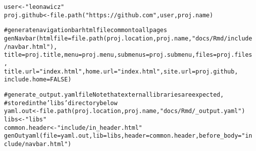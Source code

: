 \documentclass{article}\usepackage[]{graphicx}\usepackage[]{color}
\makeatletter
\newcommand{\hlnum}[1]{\textcolor[rgb]{0.863,0.196,0.184}{#1}}%
\newcommand{\hlstr}[1]{\textcolor[rgb]{0.863,0.196,0.184}{#1}}%
\newcommand{\hlcom}[1]{\textcolor[rgb]{0.345,0.431,0.459}{#1}}%
\newcommand{\hlstd}[1]{\textcolor[rgb]{0.514,0.58,0.588}{#1}}%
\newcommand{\hlkwb}[1]{\textcolor[rgb]{0.522,0.6,0}{#1}}%
\newcommand{\hlkwc}[1]{\textcolor[rgb]{0.796,0.294,0.086}{#1}}%
\newcommand{\hlkwd}[1]{\textcolor[rgb]{0.576,0.631,0.631}{#1}}%
\newenvironment{kframe}{%
 \def\at@end@of@kframe{}%
 \ifinner\ifhmode%
  \def\at@end@of@kframe{\end{minipage}}%
  \begin{minipage}{\columnwidth}%
 \fi\fi%
 \def\FrameCommand##1{\hskip\@totalleftmargin \hskip-\fboxsep
 \colorbox{shadecolor}{##1}\hskip-\fboxsep
     \hskip-\linewidth \hskip-\@totalleftmargin \hskip\columnwidth}%
 \MakeFramed {\advance\hsize-\width
   \@totalleftmargin\z@ \linewidth\hsize
   \@setminipage}}%
 {\par\unskip\endMakeFramed%
 \at@end@of@kframe}
\newenvironment{knitrout}{}{} %
\makeatother
\begin{document}
\begin{knitrout}
\begin{kframe}
\begin{alltt}
\hlstd{user} \hlkwb{<-} \hlstr{"leonawicz"}
\hlstd{proj.github} \hlkwb{<-} \hlkwd{file.path}\hlstd{(}\hlstr{"https://github.com"}\hlstd{, user, proj.name)}

\hlcom{# generate navigation bar html file common to all pages}
\hlkwd{genNavbar}\hlstd{(}\hlkwc{htmlfile} \hlstd{=} \hlkwd{file.path}\hlstd{(proj.location, proj.name,} \hlstr{"docs/Rmd/include/navbar.html"}\hlstd{),}
    \hlkwc{title} \hlstd{= proj.title,} \hlkwc{menu} \hlstd{= proj.menu,} \hlkwc{submenus} \hlstd{= proj.submenu,} \hlkwc{files} \hlstd{= proj.files,}
    \hlkwc{title.url} \hlstd{=} \hlstr{"index.html"}\hlstd{,} \hlkwc{home.url} \hlstd{=} \hlstr{"index.html"}\hlstd{,} \hlkwc{site.url} \hlstd{= proj.github,}
    \hlkwc{include.home} \hlstd{=} \hlnum{FALSE}\hlstd{)}

\hlcom{# generate _output.yaml file Note that external libraries are expected,}
\hlcom{# stored in the 'libs' directory below}
\hlstd{yaml.out} \hlkwb{<-} \hlkwd{file.path}\hlstd{(proj.location, proj.name,} \hlstr{"docs/Rmd/_output.yaml"}\hlstd{)}
\hlstd{libs} \hlkwb{<-} \hlstr{"libs"}
\hlstd{common.header} \hlkwb{<-} \hlstr{"include/in_header.html"}
\hlkwd{genOutyaml}\hlstd{(}\hlkwc{file} \hlstd{= yaml.out,} \hlkwc{lib} \hlstd{= libs,} \hlkwc{header} \hlstd{= common.header,} \hlkwc{before_body} \hlstd{=} \hlstr{"include/navbar.html"}\hlstd{)}
\end{alltt}
\end{kframe}
\end{knitrout}
\end{document}
